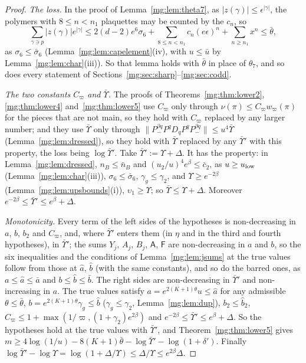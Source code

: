 \documentclass[11pt,a4paper]{article}
\theoremstyle{definition}
\theoremstyle{remark}
\newcommand{\norm}[1]{\lVert #1\rVert}
\begin{document}
\begin{proof}
\emph{The loss.} In the proof of Lemma~\ref{mg:lem:theta7}, as $|z(\gamma)|\le\epsilon^{|\gamma|}$, the polymers with $8\le n<n_1$ plaquettes may be counted by the $c_n$, so
\[
\sum_{\gamma\ni p}|z(\gamma)|e^{|\gamma|}\le2(d-2)e^6\sigma_6+\sum_{8\le n<n_1}c_n(e\epsilon)^n+\sum_{n\ge n_1}x^n\le\bar\theta,
\]
as $\sigma_6\le\bar\sigma_6$ (Lemma~\ref{mg:lem:capelement}(iv), with $u\le\bar u$ by Lemma~\ref{mg:lem:char}(iii)). So that lemma holds with $\bar\theta$ in place of $\theta_7$, and so does every
statement of Sections~\ref{mg:sec:sharp}--\ref{mg:sec:codd}.

\emph{The two constants $C_\varpi$ and $\bar\Upsilon$.} The proofs of Theorems~\ref{mg:thm:lower2}, \ref{mg:thm:lower4} and~\ref{mg:thm:lower5} use $C_\varpi$ only through
$\nu(\pi)\le C_\varpi w_\varpi(\pi)$ for the pieces that are not main, so they hold with $C_\varpi$ replaced by any larger number; and they use $\bar\Upsilon$ only through
$\norm{P^{\partial q}_-P^qD_qP^qP^{\partial q}_-}\le u^4\bar\Upsilon$ (Lemma~\ref{mg:lem:dressed}), so they hold with $\bar\Upsilon$ replaced by any $\bar\Upsilon'$ with this property, the
loss being $\log\bar\Upsilon'$. Take $\bar\Upsilon':=\Upsilon+\Delta$. It has the property: in Lemma~\ref{mg:lem:dressed}, $n_B\le\bar n_B$ and $(u_2/u)^4e^\beta\le\bar c_2$, as $u\ge u_{\rm low}$
(Lemma~\ref{mg:lem:char}(iii)), $\sigma_6\le\bar\sigma_6$, $\gamma_g\le\gamma_2$, and $\Upsilon\ge e^{-2\beta}$ (Lemma~\ref{mg:lem:upsbounds}(i)), $\upsilon_1\ge\Upsilon$; so $\bar\Upsilon\le\Upsilon+\Delta$.
Moreover $e^{-2\beta}\le\bar\Upsilon'\le e^\beta+\Delta$.

\emph{Monotonicity.} Every term of the left sides of the hypotheses is non-decreasing in $a$, $b$, $b_2$ and $C_\varpi$, and, where $\bar\Upsilon'$ enters them (in $\eta$ and in the third
and fourth hypotheses), in $\bar\Upsilon'$; the sums $Y_j$, $A_j$, $B_j$, $\mathsf A$, $\mathsf F$ are non-decreasing in $a$ and $b$, so the six inequalities and the conditions of
Lemma~\ref{mg:lem:jsums} at the true values follow from those at $\hat a$, $\hat b$ (with the same constants), and so do the barred ones, as $a\le\hat a\le\bar a$ and $b\le\hat b\le\bar b$. The
right sides are non-decreasing in $\bar\Upsilon'$ and non-increasing in $a$. The true values satisfy $a=e^{2(K+1)\theta}u\le\hat a$ for any admissible $\theta\le\bar\theta$,
$b=e^{2(K+1)\theta}\gamma_g\le\hat b$ ($\gamma_g\le\gamma_2$, Lemma~\ref{mg:lem:dup}), $b_2\le\hat b_2$, $C_\varpi\le1+\max(1/\varpi,(1+\gamma_2)e^{2\beta})$ and
$e^{-2\beta}\le\bar\Upsilon'\le e^\beta+\Delta$. So the hypotheses hold at the true values
with $\bar\Upsilon'$, and Theorem~\ref{mg:thm:lower5} gives $m\ge4\log(1/u)-8(K+1)\bar\theta-\log\bar\Upsilon'-\log(1+\delta')$. Finally
$\log\bar\Upsilon'-\log\Upsilon=\log(1+\Delta/\Upsilon)\le\Delta/\Upsilon\le e^{2\beta}\Delta$.
\end{proof}
\end{document}
